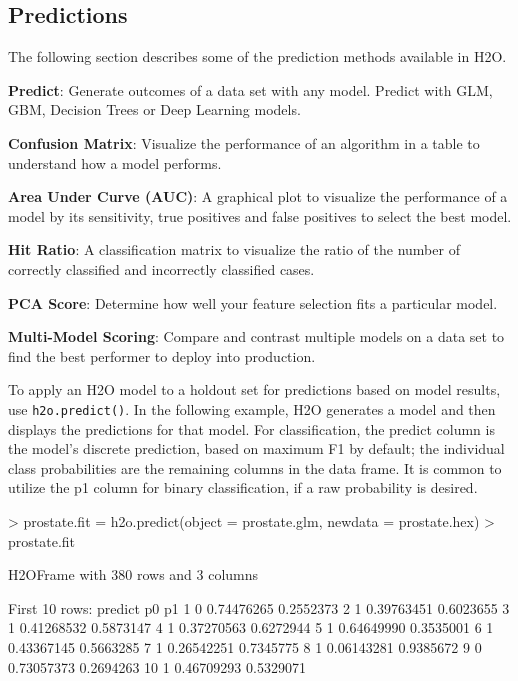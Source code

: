\subsection{Predictions}

The following section describes some of the prediction methods available in H2O. 

{\textbf{Predict}}: Generate outcomes of a data set with any model. Predict with GLM, GBM, Decision Trees or Deep Learning models.\bigskip

{\textbf{Confusion Matrix}}: Visualize the performance of an algorithm in a table to understand how a model performs.\bigskip

{\textbf{Area Under Curve (AUC)}}: A graphical plot to visualize the performance of a model by its sensitivity, true positives and false positives to select the best model.\bigskip

{\textbf{Hit Ratio}}: A classification matrix to visualize the ratio of the number of correctly classified and incorrectly classified cases.\bigskip

{\textbf{PCA Score}}: Determine how well your feature selection fits a particular model.\bigskip

{\textbf{Multi-Model Scoring}}: Compare and contrast multiple models on a data set to find the best performer to deploy into production. 

To apply an H2O model to a holdout set for predictions based on model results, use {\texttt{h2o.predict()}}.  
In the following example, H2O generates a model and then displays the predictions for that model.
For classification, the predict column is the model's discrete prediction, based on maximum F1 by default; the individual class probabilities are the remaining columns in the data frame. 
It is common to utilize the p1 column for binary classification, if a raw probability is desired.
\begin{spverbatim}
> prostate.fit = h2o.predict(object = prostate.glm, newdata = prostate.hex)
> prostate.fit

H2OFrame with 380 rows and 3 columns

First 10 rows:
   predict         p0        p1
1        0 0.74476265 0.2552373
2        1 0.39763451 0.6023655
3        1 0.41268532 0.5873147
4        1 0.37270563 0.6272944
5        1 0.64649990 0.3535001
6        1 0.43367145 0.5663285
7        1 0.26542251 0.7345775
8        1 0.06143281 0.9385672
9        0 0.73057373 0.2694263
10       1 0.46709293 0.5329071
\end{spverbatim}


